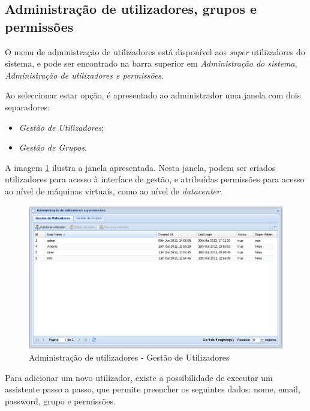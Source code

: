\subsection{Administração de utilizadores, grupos e permissões}
O menu de administração de utilizadores está disponível aos \textit{super} utilizadores do sistema, e pode ser encontrado na barra superior em \textit{Administração do sistema}, \textit{Administração de utilizadores e permissões}.

Ao seleccionar estar opção, é apresentado ao administrador uma janela com dois separadores:  
\begin{itemize}
	\item \textit{Gestão de Utilizadores};
	\item \textit{Gestão de Grupos}.
\end{itemize}

A imagem \ref{fig:admin_users} ilustra a janela apresentada. Nesta janela, podem ser criados utilizadores para acesso à interface de gestão, e atribuídas permissões para acesso ao nível de máquinas virtuais, como ao nível de \textit{datacenter}.

\begin{figure}[H]
        \begin{center}
        \includegraphics[scale=0.4]{screenshots/users/admin_users.png}
        \caption{Administração de utilizadores - Gestão de Utilizadores}
        \label{fig:admin_users}
        \end{center}
\end{figure}

Para adicionar um novo utilizador, existe a possibilidade de executar um assistente passo a passo, que permite preencher os seguintes dados: nome, email, password, grupo e permissões.


